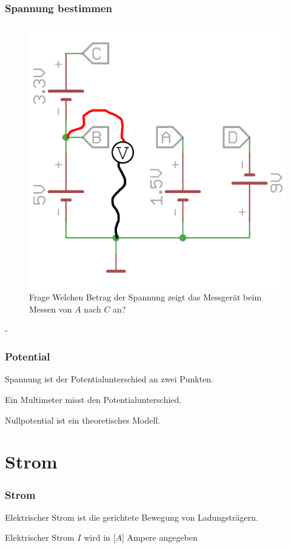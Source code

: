 \begin{frame}
    \frametitle{Spannung bestimmen}
    \begin{center}
  \begin{figure}
      \includegraphics[width=.4\textwidth,height=.75\textheight,keepaspectratio]{e02/SpannungMess.png}
      \caption{Frage Welchen Betrag der Spannung zeigt das Messgerät beim Messen von $A$ nach $C$ an?}
    \end{figure}-
    \end{center}
\end{frame}

\begin{frame}
    \frametitle{Potential}
    \begin{block}{}
      Spannung ist der Potentialunterschied an zwei Punkten.
    \end{block}
    \begin{block}{}
      Ein Multimeter misst den Potentialunterschied.
    \end{block}
    \begin{block}{}
      Nullpotential ist ein theoretisches Modell.
    \end{block}
\end{frame}

\section*{Strom}

\begin{frame}
    \frametitle{Strom}
    \begin{center}
    \begin{block}{}
        Elektrischer Strom ist die gerichtete Bewegung von Ladungsträgern.
    \end{block}
    \begin{block}{}
        Elektrischer Strom $I$ wird in [$A$] Ampere angegeben
    \end{block}
    \end{center}
\end{frame}

